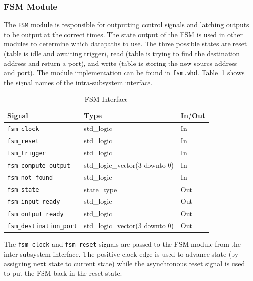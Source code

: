 \documentclass{article}
\begin{document}
\newpage
\subsubsection{FSM Module} \label{fsm}

The \texttt{FSM} module is responsible for outputting control signals and latching outputs to be output at the correct times. The state output of the FSM is used in other modules to determine which datapaths to use. The three possible states are reset (table is idle and awaiting trigger), read (table is trying to find the destination address and return a port), and write (table is storing the new source address and port). The module implementation can be found in \texttt{fsm.vhd}. Table~\ref{tab:fsm} shows the signal names of the intra-subsystem interface. 

\begin{table}[ht]
    \begin{center}
        \begin{tabular}{lll}\hline
        Signal & Type & In/Out \\
        \hline
        \texttt{fsm\_clock} & std\_logic & In \\
        \hline
        \texttt{fsm\_reset} & std\_logic & In \\
        \hline
        \texttt{fsm\_trigger} & std\_logic & In \\
        \hline
        \texttt{fsm\_compute\_output} & std\_logic\_vector(3 downto 0) & In \\
        \hline
        \texttt{fsm\_not\_found} & std\_logic & In \\
        \hline
        \texttt{fsm\_state} & state\_type & Out \\
        \hline
        \texttt{fsm\_input\_ready} & std\_logic & Out \\
        \hline
        \texttt{fsm\_output\_ready} & std\_logic & Out \\
        \hline
        \texttt{fsm\_destination\_port} & std\_logic\_vector(3 downto 0) & Out \\
        \hline
        \end{tabular}
        \caption{FSM Interface}\label{tab:fsm}
    \end{center}
\end{table}

The \texttt{fsm\_clock} and \texttt{fsm\_reset} signals are passed to the FSM module from the inter-subsystem interface. The positive clock edge is used to advance state (by assigning next state to current state) while the asynchronous reset signal is used to put the FSM back in the reset state. 
\end{document}
